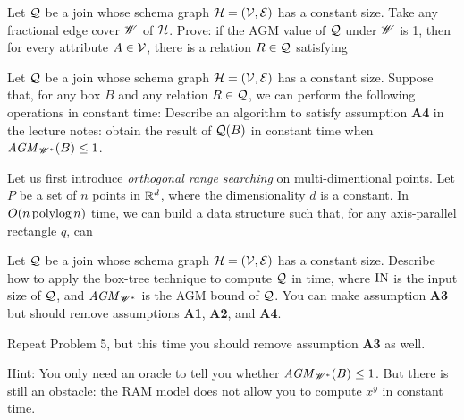  Let $\mathcal{Q}$ be a join whose schema graph $\mathcal{H} = (\mathcal{V}, \mathcal{E})$ has a constant size. Take any fractional edge cover $\mathscr{W}$ of $\mathcal{H}$. Prove: if the AGM value of $\mathcal{Q}$ under $\mathscr{W}$ is 1, then for every attribute $A \in \mathcal{V}$, there is a relation $R \in \mathcal{Q}$ satisfying

 Let $\mathcal{Q}$ be a join whose schema graph $\mathcal{H} = (\mathcal{V}, \mathcal{E})$ has a constant size. Suppose that, for any box $B$ and any relation $R \in \mathcal{Q}$, we can perform the following operations in constant time:
Describe an algorithm to satisfy assumption {\bf A4} in the lecture notes: obtain the result of $\mathcal{Q}(B)$ in constant time when $\mathit{AGM}_{\mathscr{W}^*}(B) \le 1$.

 Let us first introduce {\em orthogonal range searching} on multi-dimentional points. Let $P$ be a set of $n$ points in $\mathbb{R}^d$, where the dimensionality $d$ is a constant. In $O(n \operatorname*{polylog} n)$ time, we can build a data structure such that, for any axis-parallel rectangle $q$, can

Let $\mathcal{Q}$ be a join whose schema graph $\mathcal{H} = (\mathcal{V}, \mathcal{E})$ has a constant size. Describe how to apply the box-tree technique to compute $\mathcal{Q}$ in
time, where $\text{IN}$ is the input size of $\mathcal{Q}$, and $\mathit{AGM}_{\mathscr{W}^*}$ is the AGM bound of $\mathcal{Q}$. You can make assumption {\bf A3} but should remove assumptions {\bf A1}, {\bf A2}, and {\bf A4}.

 Repeat Problem 5, but this time you should remove assumption {\bf A3} as well.

\vgap

Hint: You only need an oracle to tell you whether $\mathit{AGM}_{\mathscr{W}^*}(B) \le 1$. But there is still an obstacle: the RAM model does not allow you to compute $x^y$ in constant time.

